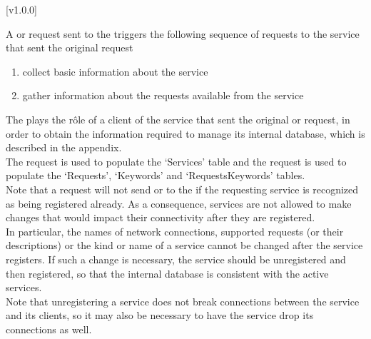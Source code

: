 [v1.0.0]

A  or
 request sent to the
 triggers the following sequence of
requests to the service that sent the original request \longDash{}
\begin{enumerate}
\item\textbf{} collect basic information about the
service
\item\textbf{} gather information about the requests
available from the service
\end{enumerate}
The  plays the r\^ole of a client of the
service that sent the original 
or  request, in order to obtain the
information required to manage its internal database, which is described in the
 appendix.\\

The  request is used to populate the `Services' table
and the  request is used to populate the `Requests',
`Keywords' and `RequestsKeywords' tables.\\

Note that a  request will not
send  or  to the
 if the requesting service is recognized
as being registered already.
As a consequence, services are not allowed to make changes that would impact their
connectivity after they are registered.\\

In particular, the names of \yarp{} network connections, supported requests (or their
descriptions) or the kind or name of a service cannot be changed after the service
registers.
If such a change is necessary, the service should be unregistered and then registered, so
that the internal database is consistent with the active services.\\

Note that unregistering a service does not break connections between the service and its
clients, so it may also be necessary to have the service drop its connections as well.
\appendixEnd{}
